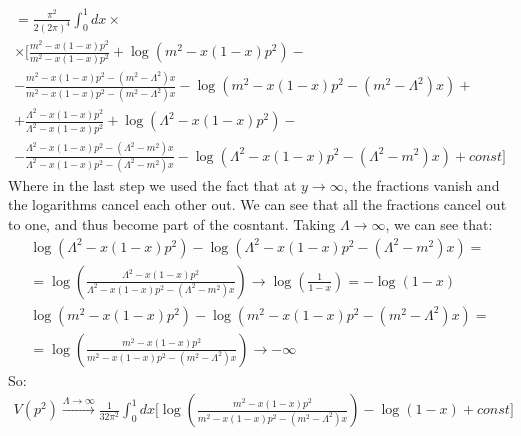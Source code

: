 \documentclass{article}
\begin{document}
\begin{equation*}
\begin{gathered}
    = \frac{\pi^2}{2(2\pi)^4} \int_0^1 dx \times \\ \times
    \Bigg[
        \frac{m^2 - x(1 - x) p^2}{m^2 - x(1 - x) p^2} + \log(m^2 - x(1 - x) p^2) - \\
        - \frac{m^2 - x(1 - x) p^2 - \left(m^2 - \Lambda^2\right) x}{m^2 - x(1 - x) p^2 - \left(m^2 - \Lambda^2\right) x} - \log(m^2 - x(1 - x) p^2 - \left(m^2 - \Lambda^2\right) x) + \\
        +
        \frac{\Lambda^2 - x(1 - x) p^2}{\Lambda^2 - x(1 - x) p^2} + \log(\Lambda^2 - x(1 - x) p^2) - \\
        -
        \frac{\Lambda^2 - x(1 - x) p^2 - \left(\Lambda^2 - m^2\right) x}{\Lambda^2 - x(1 - x) p^2 - \left(\Lambda^2 - m^2\right) x} - \log(\Lambda^2 - x(1 - x) p^2 - \left(\Lambda^2 - m^2\right) x)
        + const
    \Bigg]
\end{gathered}
\end{equation*}
Where in the last step we used the fact that at $y \rightarrow \infty$, the fractions vanish and the logarithms cancel each other out. We can see that all the fractions cancel out to one, and thus become part of the cosntant. Taking $\Lambda \rightarrow \infty$, we can see that:
\begin{equation}
\begin{gathered}
    \log(\Lambda^2 - x(1 - x) p^2) - \log(\Lambda^2 - x(1 - x) p^2 - \left(\Lambda^2 - m^2\right) x) = \\ = \log(\frac{\Lambda^2 - x(1 - x) p^2}{\Lambda^2 - x(1 - x) p^2 - \left(\Lambda^2 - m^2\right) x}) \rightarrow \log(\frac{1}{1 - x}) = -\log(1 - x)
    \\
    \log(m^2 - x(1 - x) p^2) - \log(m^2 - x(1 - x) p^2 - \left(m^2 - \Lambda^2\right) x) = \\ = \log(\frac{m^2 - x(1 - x) p^2}{m^2 - x(1 - x) p^2 - \left(m^2 - \Lambda^2\right) x}) \rightarrow -\infty
\end{gathered}
\end{equation}
So:
\begin{equation}
\begin{gathered}
    V\left(p^2\right) \xrightarrow{\Lambda \rightarrow \infty}
    \frac{1}{32\pi^2} \int_0^1 dx
    \Bigg[
        \log(\frac{m^2 - x(1 - x) p^2}{m^2 - x(1 - x) p^2 - \left(m^2 - \Lambda^2\right) x}) - \log(1 - x) + const \Bigg]
\end{gathered}
\end{equation}
\end{document}
